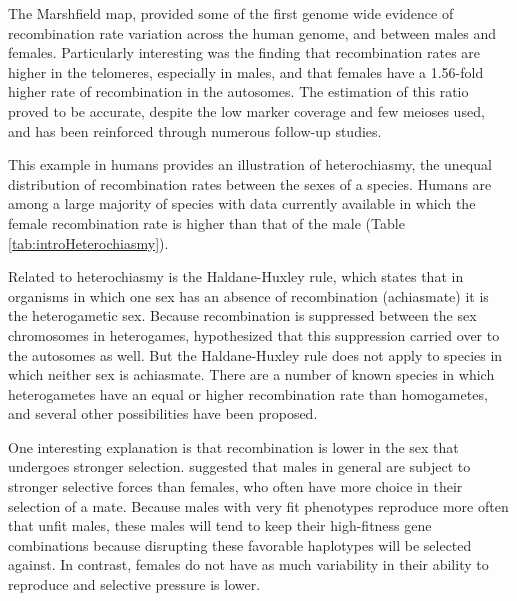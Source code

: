 The Marshfield map\cite{Broman1998}, provided some of the first genome wide evidence of recombination rate variation across the human genome, and between males and females.
Particularly interesting was the finding that recombination rates are higher in the telomeres, especially in males, and that females have a 1.56-fold higher rate of recombination in the autosomes.
The estimation of this ratio proved to be accurate, despite the low marker coverage and few meioses used, and has been reinforced through numerous follow-up studies\cite{Broman2000,Kong2002,Coop2008,Kong2010,Bleazard2013,Campbell2015,Bherer2016}. %

This example in humans provides an illustration of heterochiasmy, the unequal distribution of recombination rates between the sexes of a species.
Humans are among a large majority of species with data currently available in which the female recombination rate is higher than that of the male (Table \ref{tab:introHeterochiasmy}).

Related to heterochiasmy is the Haldane-Huxley rule\cite{Haldane1922,Huxley1928}, which states that in organisms in which one sex has an absence of recombination (achiasmate) it is the heterogametic sex.
Because recombination is suppressed between the sex chromosomes in heterogames, \citet{Haldane1922} hypothesized that this suppression carried over to the autosomes as well.
But the Haldane-Huxley rule does not apply to species in which neither sex is achiasmate.
There are a number of known species in which heterogametes have an equal or higher recombination rate than homogametes, and several other possibilities have been proposed.

One interesting explanation is that recombination is lower in the sex that undergoes stronger selection.
\citet{Trivers1988} suggested that males in general are subject to stronger selective forces than females, who often have more choice in their selection of a mate.
Because males with very fit phenotypes reproduce more often that unfit males, these males will tend to keep their high-fitness gene combinations because disrupting these favorable haplotypes will be selected against.
In contrast, females do not have as much variability in their ability to reproduce and selective pressure is lower.

